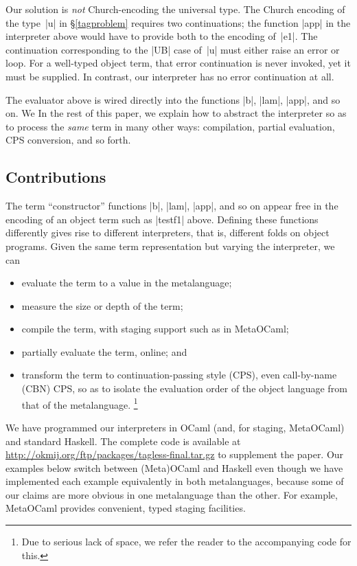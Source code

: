 Our solution is \emph{not} Church-encoding the
universal type. The Church encoding of the type~|u| in \S\ref{tagproblem}
requires two continuations; the function |app| in the interpreter above would
have to provide both to the encoding of~|e1|. The continuation
corresponding to the |UB| case of~|u| must either raise an error or
loop. For a well-typed object term, that error continuation is never
invoked, yet it must be supplied. In contrast, our interpreter has no error
continuation at all.

The evaluator above is wired directly into the
functions |b|, |lam|, |app|, and so on.  \ifshort We \else In the rest of this paper, we \fi
explain how to abstract the interpreter so as
to process the \emph{same} term in many other
ways: compilation, partial evaluation, CPS
conversion, and so forth.

\subsection{Contributions}\label{contributions}

The term ``constructor'' functions |b|, |lam|, |app|, and so on appear
free in the encoding of an object term such as |testf1| above.  Defining
these functions differently gives rise to different interpreters, that
is, different folds on object programs.  Given the same term
representation but varying the interpreter, we can
\begin{itemize}
    \item evaluate the term to a value in the metalanguage;
    \item measure the size or depth of the term;
    \item compile the term, with staging support such as in MetaOCaml;
    \item partially evaluate the term, online; and
    \item transform the term to continuation\hyp passing style (CPS),
        even call-by-name (CBN) CPS, so as to isolate the evaluation
        order of the object language from that of the metalanguage.\ifshort
\footnote{Due to serious lack of space, 
we refer the reader to the accompanying code for this.}\fi
\end{itemize}
We have programmed our interpreters in OCaml (and, for staging,
MetaOCaml) and standard Haskell. The complete code is available at
\url{http://okmij.org/ftp/packages/tagless-final.tar.gz}
to supplement the paper. Our examples below switch between (Meta)OCaml
and Haskell even though we have implemented each example equivalently in
both metalanguages, because some of our claims are more obvious in one
metalanguage than the other.  For example, MetaOCaml provides
convenient, typed staging facilities.

